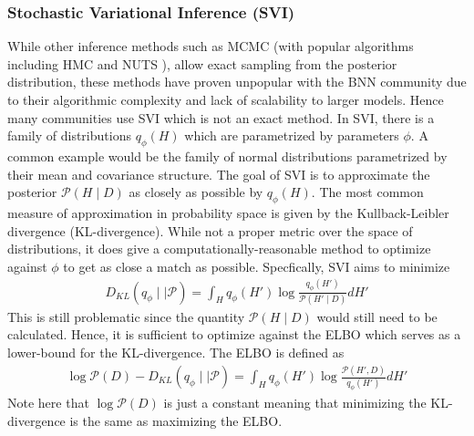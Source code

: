 \subsubsection{Stochastic Variational Inference (SVI)}
While other inference methods such as MCMC (with popular algorithms including HMC and NUTS \cite{betancourt_conceptual_2018} \cite{hoffman_no-u-turn_2011}), allow exact sampling from the posterior distribution, these methods have proven unpopular with the BNN community due to their algorithmic complexity and lack of scalability to larger models. Hence many communities use SVI which is not an exact method. In SVI, there is a family of distributions $q_{\phi}(H)$ which are parametrized by parameters $\phi$. A common example would be the family of normal distributions parametrized by their mean and covariance structure. The goal of SVI is to approximate the posterior $\mathcal{P}(H \mid D)$ as closely as possible by $q_{\phi}(H)$. The most common measure of approximation in probability space is given by the Kullback-Leibler divergence (KL-divergence). While not a proper metric over the space of distributions, it does give a computationally-reasonable method to optimize against $\phi$ to get as close a match as possible. Specfically, SVI aims to minimize
\begin{align*}
  D_{KL}(q_{\phi} \mid\mid \mathcal{P}) = \int_H q_{\phi}(H')\log \frac{q_{\phi}(H')}{\mathcal{P}(H' \mid D)} dH'
\end{align*} 
This is still problematic since the quantity $\mathcal{P}(H \mid D)$ would still need to be calculated. Hence, it is sufficient to optimize against the ELBO which serves as a lower-bound for the KL-divergence. The ELBO is defined as
\begin{align*}
  \log \mathcal{P}(D) - D_{KL}(q_{\phi} \mid\mid \mathcal{P}) = \int_H q_{\phi}(H')\log \frac{\mathcal{P}(H', D)}{q_{\phi}(H')} dH'
\end{align*}
Note here that $\log \mathcal{P}(D)$ is just a constant meaning that minimizing the KL-divergence is the same as maximizing the ELBO.
